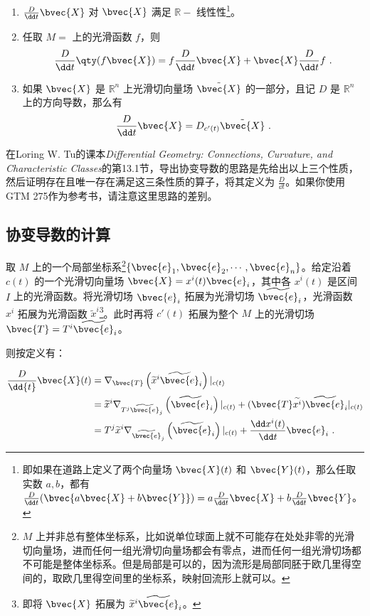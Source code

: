 \begin{enumerate}
\item $\frac{D}{\dd t}\bvec{X}$ 对 $\bvec{X}$ 满足 $\mathbb{R}-$ 线性性\footnote{即如果在道路上定义了两个向量场 $\bvec{X}(t)$ 和 $\bvec{Y}(t)$，那么任取实数 $a, b$，都有 $\frac{D}{\dd t}(\bvec{a\bvec{X}+b\bvec{Y}})=a\frac{D}{\dd t}\bvec{X}+b\frac{D}{\dd t}\bvec{Y}$。}。
\item 任取 $M=$ 上的光滑函数 $f$，则
\begin{equation}
\frac{D}{\dd t}\qty(f\bvec{X})=f\frac{D}{\dd t}\bvec{X}+\bvec{X}\frac{D}{\dd t}f~.
\end{equation}
\item 如果 $\bvec{X}$ 是 $\mathbb{R}^n$ 上光滑切向量场 $\tilde{\bvec{X}}$ 的一部分，且记 $D$ 是 $\mathbb{R}^n$ 上的方向导数，那么有
\begin{equation}
\frac{D}{\dd t}\bvec{X}=D_{c'(t)}\tilde{\bvec{X}}~.
\end{equation}

\end{enumerate}

在Loring W. Tu的课本\textsl{Differential Geometry: Connections, Curvature, and Characteristic Classes}\cite{GTM275}的第13.1节，导出协变导数的思路是先给出以上三个性质，然后证明存在且唯一存在满足这三条性质的算子，将其定义为 $\frac{D}{\dd t}$。如果你使用GTM 275作为参考书，请注意这里思路的差别。



\subsection{协变导数的计算}

取 $M$ 上的一个局部坐标系\footnote{$M$ 上并非总有整体坐标系，比如说单位球面上就不可能存在处处非零的光滑切向量场，进而任何一组光滑切向量场都会有零点，进而任何一组光滑切场都不可能是整体坐标系。但是局部是可以的，因为流形是局部同胚于欧几里得空间的，取欧几里得空间里的坐标系，映射回流形上就可以。}$\{\bvec{e}_1, \bvec{e}_2, \cdots, \bvec{e}_n\}$。给定沿着 $c(t)$ 的一个光滑切向量场 $\bvec{X}=x^i(t)\bvec{e}_i$，其中各 $x^i(t)$ 是区间 $I$ 上的光滑函数。将光滑切场 $\bvec{e}_i$ 拓展为光滑切场 $\widetilde{\bvec{e}}_i$，光滑函数 $x^i$ 拓展为光滑函数 $\widetilde{x}^i$\footnote{即将 $\bvec{X}$ 拓展为 $\widetilde{x}^i\widetilde{\bvec{e}}_i$。}。此时再将 $c'(t)$ 拓展为整个 $M$ 上的光滑切场 $\bvec{T}=T^i\widetilde{\bvec{e}}_i$。

则按定义有：

\begin{equation}\label{eq_CoDer_5}
\begin{aligned}
 \frac{D}{\dd{t}} \bvec{X}(t) &= \nabla_{\bvec{T}} \left(\widetilde{x}^i \widetilde
 {\bvec{e}}_i\right) |_{c(t)} \\
&=\widetilde{x}^i\nabla_{T^j\widetilde{\bvec{e}}_j}\left(\widetilde{\bvec{e}}_i\right) |_{c(t)} + (\bvec{T}\widetilde{x^i})\widetilde{\bvec{e}}_i|_{c(t)}\\
&=T^j\widetilde{x}^i\nabla_{\widetilde{\bvec{e}}_j}\left(\widetilde{\bvec{e}}_i\right)|_{c(t)}+\frac{\dd x^i(t)}{\dd t}\bvec{e}_i~.
\end{aligned}
\end{equation}

